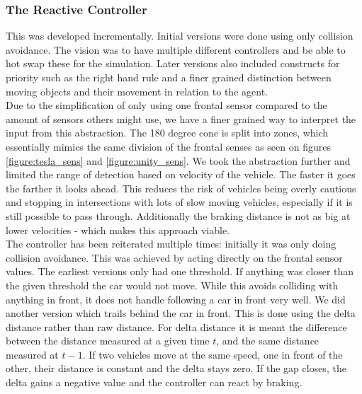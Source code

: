 \subsubsection{The Reactive Controller}
This was developed incrementally. Initial versions were done using only collision avoidance.
The vision was to have multiple different controllers and be able to hot swap these for the simulation.
Later versions also included constructs for priority such as the right hand rule and a finer grained distinction between moving objects and their movement in relation to the agent.\\

Due to the simplification of only using one frontal sensor compared to the amount of sensors others might use, we have a finer grained way to interpret the input from this abstraction.
The 180 degree cone is split into zones, which essentially mimics the same division of the frontal senses as seen on figures \ref{figure:tesla_sens} and \ref{figure:unity_sens}.
We took the abstraction further and limited the range of detection based on velocity of the vehicle. The faster it goes the farther it looks ahead.
This reduces the risk of vehicles being overly cautious and stopping in intersections with lots of slow moving vehicles, especially if it is still possible to pass through.
Additionally the braking distance is not as big at lower velocities - which makes this approach viable.\\

The controller has been reiterated multiple times: initially it was only doing collision avoidance.
This was achieved by acting directly on the frontal sensor values.
The earliest versions only had one threshold. If anything was closer than the given threshold the car would not move.
While this avoids colliding with anything in front, it does not handle following a car in front very well.
We did another version which trails behind the car in front.
This is done using the delta distance rather than raw distance.
For delta distance it is meant the difference between the distance measured at a given time $t$, and the same distance measured at $t-1$. 
If two vehicles move at the same speed, one in front of the other, their distance is constant and the delta stays zero.
If the gap closes, the delta gains a negative value and the controller can react by braking. 

